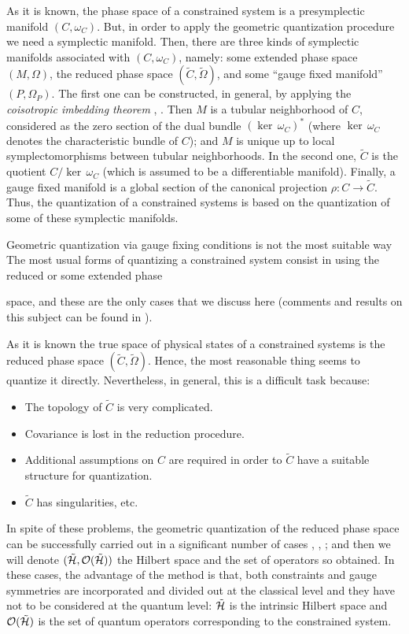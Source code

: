 \documentclass[12pt]{article}
\theoremstyle{plain}
\def\Hr{\tilde{\cal H}}
\def\rps{(\tilde C,\tilde\Omega )}
\begin{document}
As it is known,  the phase space of a constrained system is a
presymplectic manifold $(C,\omega_C)$. But, in order to apply the
geometric quantization procedure we need a symplectic manifold.
Then, there are three kinds of symplectic manifolds associated
with $(C,\omega_C)$, namely: some extended phase space $(M,\Omega
)$, the reduced phase space $\rps$, and some ``gauge fixed
manifold'' $(P,\Omega_P)$. The first one can be constructed, in
general, by applying the {\it coisotropic imbedding theorem}
\cite{Go-cit}, \cite{Ma-src}. Then $M$ is a tubular neighborhood
of $C$, considered as the zero section of the dual bundle
$(\ker\,\omega_C)^*$ (where $\ker\,\omega_C$ denotes the
characteristic bundle of $C$); and $M$ is unique up to local
symplectomorphisms between tubular neighborhoods. In the second
one, $\tilde C$ is the quotient $C/\ker\,\omega_C$ (which is
assumed to be a differentiable manifold). Finally, a gauge fixed
manifold is a global section of the canonical projection
$\rho\colon C\to\tilde C$. Thus, the quantization of a constrained
systems is based on the quantization of some of these symplectic
manifolds.

Geometric quantization via gauge fixing conditions
is not the most suitable way
The most usual forms of quantizing
a constrained system consist in using the reduced or some extended phase

space,
and these are the only cases that we discuss here
(comments and results on this subject can be found in \cite{Sn-83}).

As it is known the true space of physical states of a constrained
systems
is the reduced phase space $\rps$.
Hence, the most reasonable thing seems to quantize it directly.
Nevertheless, in general, this is a difficult task because:
\begin{itemize}
\item
The topology of $\tilde C$ is very complicated.
\item
Covariance is lost in the reduction procedure.
\item
Additional assumptions on $C$ are required in order to
$\tilde C$ have a suitable structure for quantization.
\item
$\tilde C$ has singularities, etc.
\end{itemize}
In spite of these problems, the geometric quantization
of the reduced phase space can be successfully carried out
in a significant number of cases \cite{AS-86}, \cite{Go-86},
\cite{Va-83};
and then we will denote $(\Hr ,{\cal O}(\Hr ))$
the Hilbert space  and the set of operators so obtained.
In these cases, the advantage of the method is that,
both constraints and gauge symmetries are incorporated
and divided out at the classical level and they
have not to be considered at the quantum level:
$\Hr$ is the intrinsic Hilbert space and ${\cal O}(\Hr )$ is the set of
quantum operators
corresponding to the constrained system.
\end{document}
